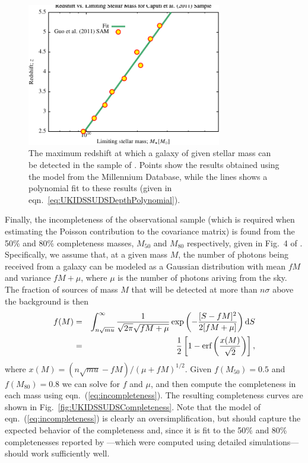 \begin{figure}
 \begin{center}
 \includegraphics[width=85mm,trim=0mm 0mm 0mm 4mm,clip]{Plots/DataAnalysis/UKIDSSUDSMassLuminosityRelation.pdf}
 \caption{The maximum redshift at which a galaxy of given stellar mass can be detected in the sample of \protect\cite{caputi_stellar_2011}. Points show the results obtained using the \protect\cite{henriques_confronting_2012} model from the Millennium Database, while the lines shows a polynomial fit to these results (given in eqn.~\ref{eq:UKIDSSUDSDepthPolynomial}).}
 \end{center}
 \label{fig:UKIDSSUDSMassRedshift}
\end{figure}

Finally, the incompleteness of the observational sample (which is required when estimating the Poisson contribution to the covariance matrix) is found from the 50\% and 80\% completeness masses, $M_{50}$ and $M_{80}$ respectively, given in Fig.~4 of \cite{caputi_stellar_2011}. Specifically, we assume that, at a given mass $M$, the number of photons being received from a galaxy can be modeled as a Gaussian distribution with mean $f M$ and variance $fM+\mu$, where $\mu$ is the number of photons ariving from the sky. The fraction of sources of mass $M$ that will be detected at more than $n \sigma$ above the background is then
\begin{eqnarray}
f(M) & = & \int_{n\sqrt{mu}}^\infty {1 \over \sqrt{2 \pi} \sqrt{f M + \mu}} \exp\left( - {[S-fM]^2 \over 2 [f M + \mu]} \right) {\mathrm d}S \nonumber \\
     & = & {1 \over 2}\left[ 1 - \hbox{erf}\left( {x(M) \over \sqrt{2}} \right)  \right],
\label{eq:incompleteness}
\end{eqnarray}
where $x(M) = (n \sqrt{mu} - f M)/(\mu+fM)^{1/2}$. Given $f(M_{\mathrm 50})=0.5$ and $f(M_{\mathrm 80})=0.8$ we can solve for $f$ and $\mu$, and then compute the completeness in each mass using eqn.~(\ref{eq:incompleteness}). The resulting completeness curves are shown in Fig.~\ref{fig:UKIDSSUDSCompleteness}. Note that the model of eqn.~(\ref{eq:incompleteness}) is clearly an oversimplification, but should capture the expected behavior of the completeness and, since it is fit to the 50\% and 80\% completenesses reported by \cite{caputi_stellar_2011}---which were computed using detailed simulations---should work sufficiently well.

